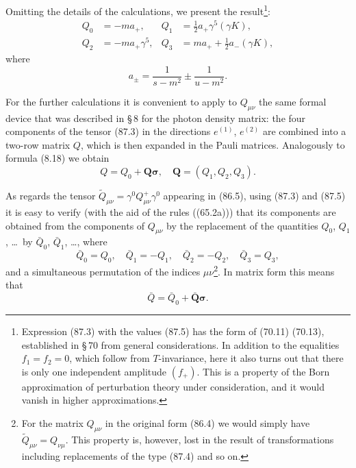 Omitting the details of the calculations, we present the result\footnote{Expression (87.3) with the values (87.5) has the form of (70.11) (70.13), established in \S\,70 from general considerations. In addition to the equalities $f_1 = f_2 = 0$, which follow from $T$-invariance, here it also turns out that there is only one independent amplitude $(f_+)$. This is a property of the Born approximation of perturbation theory under consideration, and it would vanish in higher approximations.}:
\begin{equation}
\begin{aligned}
Q_0 &= -ma_+, & Q_1 &= \tfrac{1}{2}a_+\gamma^5(\gamma K), \\
Q_2 &= -ma_+\gamma^5, & Q_3 &= ma_+ + \tfrac{1}{2}a_-(\gamma K),
\end{aligned}
\label{eq:87.5}
\end{equation}
where
\[
a_\pm = \frac{1}{s-m^2} \pm \frac{1}{u-m^2}.
\]


For the further calculations it is convenient to apply to $Q_{\mu\nu}$ the same formal device that was described in \S\,8 for the photon density matrix: the four components of the tensor (87.3) in the directions $e^{(1)}$, $e^{(2)}$ are combined into a two-row matrix $Q$, which is then expanded in the Pauli matrices. Analogously to formula (8.18) we obtain
\begin{equation}
Q = Q_0 + \mathbf{Q}\boldsymbol{\sigma}, \quad \mathbf{Q} = (Q_1, Q_2, Q_3).
\label{eq:87.6}
\end{equation}

As regards the tensor $\widetilde{Q}_{\mu\nu} = \gamma^0 Q^+_{\mu\nu}\gamma^0$ appearing in (86.5), using (87.3) and (87.5) it is easy to verify (with the aid of the rules ((65.2a))) that its components are obtained from the components of $Q_{\mu\nu}$ by the replacement of the quantities $Q_0$, $Q_1$, \dots\ by $\bar{Q}_0$, $\bar{Q}_1$, \dots, where
\begin{equation}
\bar{Q}_0 = Q_0, \quad \bar{Q}_1 = -Q_1, \quad \bar{Q}_2 = -Q_2, \quad \bar{Q}_3 = Q_3,
\label{eq:87.7}
\end{equation}
and a simultaneous permutation of the indices $\mu\nu$\footnote{For the matrix $Q_{\mu\nu}$ in the original form (86.4) we would simply have $\widetilde{Q}_{\mu\nu} = Q_{\nu\mu}$. This property is, however, lost in the result of transformations including replacements of the type (87.4) and so on.}. In matrix form this means that
\begin{equation}
\bar{Q} = \bar{Q}_0 + \bar{\mathbf{Q}}\boldsymbol{\sigma}.
\label{eq:87.8}
\end{equation}

